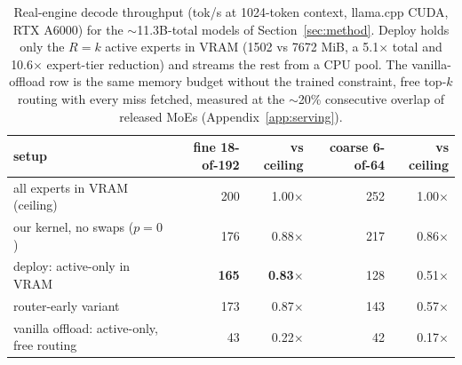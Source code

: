 \documentclass{article}
\begin{document}
\begin{table}[t]
  \centering\small
  \caption{Real-engine decode throughput (tok/s at 1024-token context, llama.cpp CUDA, RTX
  A6000) for the $\sim$11.3B-total models of Section~\ref{sec:method}. Deploy holds only the
  $R=k$ active experts in VRAM (1502 vs 7672 MiB, a 5.1$\times$ total and 10.6$\times$
  expert-tier reduction) and streams the rest from a CPU pool. The vanilla-offload row is the
  same memory budget without the trained constraint, free top-$k$ routing with every miss
  fetched, measured at the $\sim$20\% consecutive overlap of released MoEs
  (Appendix~\ref{app:serving}).}
  \label{tab:serving}
  \vspace{4pt}
  \begin{tabular}{@{}lrrrr@{}}
    \toprule
    setup & fine 18-of-192 & vs ceiling & coarse 6-of-64 & vs ceiling \\
    \midrule
    all experts in VRAM (ceiling) & 200 & 1.00$\times$ & 252 & 1.00$\times$ \\
    our kernel, no swaps ($p=0$)  & 176 & 0.88$\times$ & 217 & 0.86$\times$ \\
    deploy: active-only in VRAM   & \textbf{165} & \textbf{0.83$\times$} & 128 & 0.51$\times$ \\
    router-early variant          & 173 & 0.87$\times$ & 143 & 0.57$\times$ \\
    vanilla offload: active-only, free routing & 43 & 0.22$\times$ & 42 & 0.17$\times$ \\
    \bottomrule
  \end{tabular}
\end{table}
\end{document}
